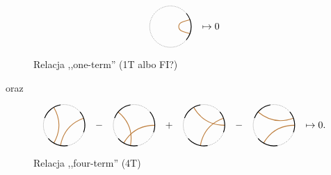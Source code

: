 \begin{figure}[H]
$$
\begin{tikzpicture}[baseline=-0.65ex,scale=0.15]
    \useasboundingbox (-7, -5) rectangle (7, 5);
    \draw[densely dotted] (-0, 0) circle (5);
    \draw[thick, brown] (20*17:5) [out=180+17*20, in=down] to (0:2) [in=180+1*20, out=up] to (20*1:5);
    \draw[thick] (20*16:5) arc (20*16:20*20:5);
\end{tikzpicture}
\mapsto 0
$$
\caption{Relacja ,,one-term'' (1T albo FI?)}
\end{figure}
oraz
\begin{figure}[H]
$$
\begin{tikzpicture}[baseline=-0.65ex,scale=0.15]
    \useasboundingbox (-7, -5) rectangle (7, 5);
    \draw[densely dotted] (-0, 0) circle (5);
    \draw[thick, brown] (20*1:5) [in=180+13*20, out=180+1*20] to (20*13:5);
    \draw[thick, brown] (20*6:5) [in=180+12*20, out=180+6*20] to (20*12:5);
    \draw[thick] (20*5 :5) arc (20*5 :20*8 :5);
    \draw[thick] (20*11:5) arc (20*11:20*14:5);
    \draw[thick] (20*17:5) arc (20*17:20*20:5);
\end{tikzpicture}
-
\begin{tikzpicture}[baseline=-0.65ex,scale=0.15]
    \useasboundingbox (-7, -5) rectangle (7, 5);
    \draw[densely dotted] (-0, 0) circle (5);
    \draw[thick, brown] (20*0:5) [in=180+12*20, out=180+0*20] to (20*12:5);
    \draw[thick, brown] (20*7:5) [in=180+13*20, out=180+7*20] to (20*13:5);
    \draw[thick] (20*5 :5) arc (20*5 :20*8 :5);
    \draw[thick] (20*11:5) arc (20*11:20*14:5);
    \draw[thick] (20*17:5) arc (20*17:20*20:5);
\end{tikzpicture}
+
\begin{tikzpicture}[baseline=-0.65ex,scale=0.15]
    \useasboundingbox (-7, -5) rectangle (7, 5);
    \draw[densely dotted] (-0, 0) circle (5);
    \draw[thick, brown] (20*0:5) [in=180+6*20, out=180+0*20] to (20*6:5);
    \draw[thick, brown] (20*1:5) [in=180+13*20, out=180+1*20] to (20*13:5);
    \draw[thick] (20*5 :5) arc (20*5 :20*8 :5);
    \draw[thick] (20*11:5) arc (20*11:20*14:5);
    \draw[thick] (20*17:5) arc (20*17:20*20:5);
\end{tikzpicture}
-
\begin{tikzpicture}[baseline=-0.65ex,scale=0.15]
    \useasboundingbox (-7, -5) rectangle (7, 5);
    \draw[densely dotted] (-0, 0) circle (5);
    \draw[thick, brown] (20*0:5) [in=180+12*20, out=180+0*20] to (20*12:5);
    \draw[thick, brown] (20*1:5) [in=180+7*20, out=180+1*20] to (20*7:5);
    \draw[thick] (20*5 :5) arc (20*5 :20*8 :5);
    \draw[thick] (20*11:5) arc (20*11:20*14:5);
    \draw[thick] (20*17:5) arc (20*17:20*20:5);
\end{tikzpicture}
\mapsto 0.
$$
\caption{Relacja ,,four-term'' (4T)}
\end{figure}

